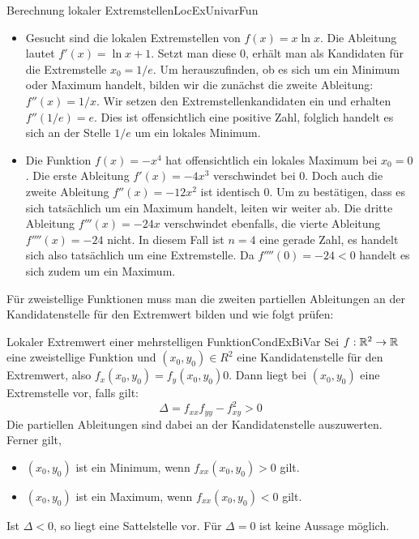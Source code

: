 \begin{example}{Berechnung lokaler Extremstellen}{LocExUnivarFun}
    \begin{itemize}
        \item Gesucht sind die lokalen Extremstellen von $f(x) = x \ln x$. Die Ableitung lautet $f'(x) = \ln x + 1$. Setzt man diese $0$, erhält man als Kandidaten für die Extremstelle $x_0 = 1/e$. Um herauszufinden, ob es sich um ein Minimum oder Maximum handelt, bilden wir die zunächst die zweite Ableitung: $f''(x) = 1 / x$. Wir setzen den Extremstellenkandidaten ein und erhalten $f''(1/e) = e$. Dies ist offensichtlich eine positive Zahl, folglich handelt es sich an der Stelle $1/e$ um ein lokales Minimum.
        \item Die Funktion $f(x) = -x^4$ hat offensichtlich ein lokales Maximum bei $x_0 = 0$. Die erste Ableitung $f'(x) = -4x^3$ verschwindet bei $0$. Doch auch die zweite Ableitung $f''(x) = -12x^2$ ist identisch $0$. Um zu bestätigen, dass es sich tatsächlich um ein Maximum handelt, leiten wir weiter ab. Die dritte Ableitung $f'''(x) = -24x$ verschwindet ebenfalls, die  vierte Ableitung $f''''(x) = -24$ nicht. In diesem Fall ist $n=4$ eine gerade Zahl, es handelt sich also tatsächlich um eine Extremstelle. Da $f''''(0) = -24 < 0$ handelt es sich zudem um ein Maximum.
    \end{itemize}
\end{example}

Für zweistellige Funktionen muss man die zweiten partiellen Ableitungen an der Kandidatenstelle für den Extremwert bilden und wie folgt prüfen:

\begin{statement}{Lokaler Extremwert einer mehrstelligen Funktion}{CondExBiVar}
    Sei $f: \mathbb{R}^2 \to \mathbb{R}$ eine zweistellige Funktion und $(x_0,y_0)\in R^2$ eine Kandidatenstelle für den Extremwert, also $f_x(x_0,y_0) = f_y(x_0,y_0) 0$. Dann liegt bei $(x_0,y_0)$ eine Extremstelle vor, falls gilt:
    $$
        \Delta = f_{xx} f_{yy} - f_{xy}^2 > 0
    $$
    Die partiellen Ableitungen sind dabei an der Kandidatenstelle auszuwerten. Ferner gilt,
    \begin{itemize}
        \item $(x_0,y_0)$ ist ein Minimum, wenn $f_{xx}(x_0,y_0) > 0$ gilt.
        \item $(x_0,y_0)$ ist ein Maximum, wenn $f_{xx}(x_0,y_0) < 0$ gilt.
    \end{itemize}
    Ist $\Delta < 0$, so liegt eine Sattelstelle vor. Für $\Delta = 0$ ist keine Aussage möglich.
\end{statement}

